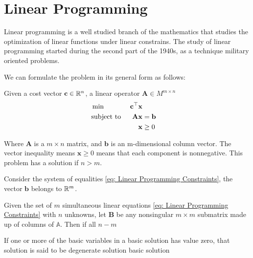 \chapter{Linear Programming}
Linear programming is a well studied branch of the mathematics that studies the optimization of linear functions under linear constrains. The study of linear programming started during the second part of the 1940s, as a technique military oriented problems.

We can formulate the problem in its general form as follows:

\begin{problem}
Given a cost vector $\mathbf{c}\in \mathbb{R}^n$, a linear operator $\mathbf{A} \in M^{m\times n}$ 
\begin{align}
	&\min & \mathbf{c}^\top\mathbf{x} \label{eq: Linear Programming Min}&\\
	&\text{subject to }& \mathbf{A}\mathbf{x}&=\mathbf{b} & \label{eq: Linear Programming Constraints} \\
	& &\mathbf{x}&\geq 0 & \label{eq: Linear Programming cone}
\end{align} 
\end{problem}
Where $\mathbf{A}$ is a $m\times n$ matrix, and $\mathbf{b}$ is an m-dimensional column vector. The vector inequality means $\mathbf{x}\geq 0$ means that each component is nonnegative. This problem has a solution if $n>m$. 

Consider the system of equalities \eqref{eq: Linear Programming Constraints}, the vector $\mathbf{b}$ belongs to $\mathbb{R}^m$.


\begin{definition}
	Given the set of $m$ simultaneous linear equations \eqref{eq: Linear Programming Constraints} with $n$ unknowns, let $\mathbf{B}$ be any nonsingular $m\times m$ submatrix made up of columns of $\mathbb{A}$. Then if all $n-m$ 
\end{definition}

\begin{definition}
	If one or more of the basic variables in a basic solution has value zero, that solution is said to be degenerate solution basic solution
\end{definition}

